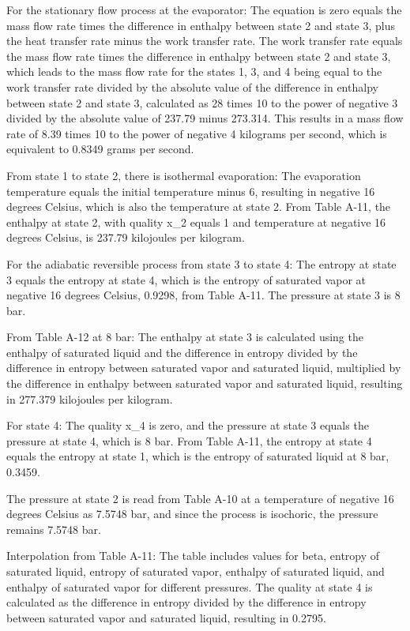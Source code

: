 For the stationary flow process at the evaporator:
The equation is zero equals the mass flow rate times the difference in enthalpy between state 2 and state 3, plus the heat transfer rate minus the work transfer rate. The work transfer rate equals the mass flow rate times the difference in enthalpy between state 2 and state 3, which leads to the mass flow rate for the states 1, 3, and 4 being equal to the work transfer rate divided by the absolute value of the difference in enthalpy between state 2 and state 3, calculated as 28 times 10 to the power of negative 3 divided by the absolute value of 237.79 minus 273.314. This results in a mass flow rate of 8.39 times 10 to the power of negative 4 kilograms per second, which is equivalent to 0.8349 grams per second.

From state 1 to state 2, there is isothermal evaporation:
The evaporation temperature equals the initial temperature minus 6, resulting in negative 16 degrees Celsius, which is also the temperature at state 2. From Table A-11, the enthalpy at state 2, with quality x_2 equals 1 and temperature at negative 16 degrees Celsius, is 237.79 kilojoules per kilogram.

For the adiabatic reversible process from state 3 to state 4:
The entropy at state 3 equals the entropy at state 4, which is the entropy of saturated vapor at negative 16 degrees Celsius, 0.9298, from Table A-11. The pressure at state 3 is 8 bar.

From Table A-12 at 8 bar:
The enthalpy at state 3 is calculated using the enthalpy of saturated liquid and the difference in entropy divided by the difference in entropy between saturated vapor and saturated liquid, multiplied by the difference in enthalpy between saturated vapor and saturated liquid, resulting in 277.379 kilojoules per kilogram.

For state 4:
The quality x_4 is zero, and the pressure at state 3 equals the pressure at state 4, which is 8 bar. From Table A-11, the entropy at state 4 equals the entropy at state 1, which is the entropy of saturated liquid at 8 bar, 0.3459.

The pressure at state 2 is read from Table A-10 at a temperature of negative 16 degrees Celsius as 7.5748 bar, and since the process is isochoric, the pressure remains 7.5748 bar.

Interpolation from Table A-11:
The table includes values for beta, entropy of saturated liquid, entropy of saturated vapor, enthalpy of saturated liquid, and enthalpy of saturated vapor for different pressures. The quality at state 4 is calculated as the difference in entropy divided by the difference in entropy between saturated vapor and saturated liquid, resulting in 0.2795.